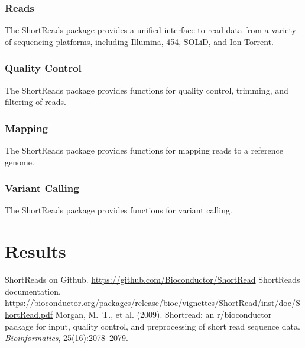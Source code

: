 \documentclass[12pt]{article}
\begin{document}
\subsubsection{Reads}
The ShortReads package provides a unified interface to read data from a variety of sequencing platforms, including Illumina, 454, SOLiD, and Ion Torrent.

\subsubsection{Quality Control}
The ShortReads package provides functions for quality control, trimming, and filtering of reads.

\subsubsection{Mapping}
The ShortReads package provides functions for mapping reads to a reference genome.

\subsubsection{Variant Calling}
The ShortReads package provides functions for variant calling.

\section{Results}


\begin{thebibliography}{10}
ShortReads on Github.
\newblock \url{https://github.com/Bioconductor/ShortRead}
ShortReads documentation.
\newblock \url{https://bioconductor.org/packages/release/bioc/vignettes/ShortRead/inst/doc/ShortRead.pdf}
Morgan, M.~T., et al. (2009).
\newblock Shortread: an r/bioconductor package for input, quality control, and
  preprocessing of short read sequence data.
\newblock \emph{Bioinformatics}, 25(16):2078--2079.
\end{thebibliography}
\end{document}

